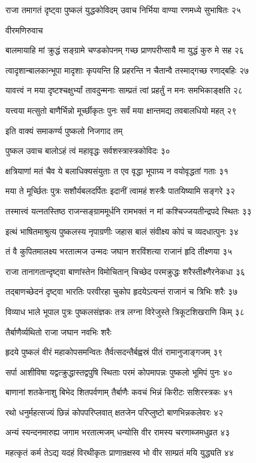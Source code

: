 राजा तमागतं दृष्ट्वा पुष्कलं युद्धकोविदम्
उवाच निर्भिया वाण्या रणमध्ये सुभाषितः २५

वीरमणिरुवाच

बालमायाहि मां क्रुद्धं सङ्ग्रामे चण्डकोपनम्
गच्छ प्राणपरीप्सायै मा युद्धं कुरु मे सह २६

त्वादृशान्बालकान्भूपा मादृशाः कृपयन्ति हि
प्रहरन्ति न चैतान्वै तस्माद्गच्छ रणाद्बहिः २७

यावत्त्वं न मया दृष्टश्चक्षुर्भ्यां तावदुन्मनाः
साम्प्रतं त्वां प्रहर्तुं न मनः समभिकाङ्क्षति २८

यत्त्वया मत्सुतो बाणैर्भिन्नो मूर्च्छीकृतः पुनः
सर्वं मया क्षान्तमद्य तवबालधियो महत् २९

इति वाक्यं समाकर्ण्य पुष्कलो निजगाद तम्

पुष्कल उवाच
बालोऽहं त्वं महावृद्धः सर्वशस्त्रास्त्रकोविदः ३०

क्षत्रियाणां मतं चैव ये बलाधिक्यसंयुताः
त एव वृद्धा भूपाग्र्य न वयोवृद्धतां गताः ३१

मया ते मूर्च्छितः पुत्रः सशौर्यबलदर्पितः
इदानीं त्वामहं शस्त्रैः पातयिष्यामि सङ्गरे ३२

तस्मात्त्वं यत्नतस्तिष्ठ राजन्सङ्ग्राममूर्धनि
रामभक्तं न मां कश्चिज्जयतीन्द्रपदे स्थितः ३३

इत्थं भाषितमाश्रुत्य पुष्कलस्य नृपाग्रणीः
जहास बालं संवीक्ष्य कोपं च व्यदधात्पुनः ३४

तं वै कुपितमालक्ष्य भरतात्मज उन्मदः
जघान शरविंशत्या राजानं हृदि तीक्ष्णया ३५

राजा तानागतान्दृष्ट्वा बाणांस्तेन विमोचितान्
चिच्छेद परमक्रुद्धः शरैस्तीक्ष्णैरनेकधा ३६

तद्बाणच्छेदनं दृष्ट्वा भारतिः परवीरहा
चुकोप हृदयेऽत्यन्तं राजानं च त्रिभिः शरैः ३७

विव्याध भाले भूपाल पुत्रः पुष्कलसंज्ञकः
तत्र लग्ना विरेजुस्ते त्रिकूटशिखराणि किम् ३८

तैर्बाणैर्व्यथितो राजा जघान नवभिः शरैः

हृदये पुष्कलं वीरं महाकोपसमन्वितः
तैर्वत्सदन्तैर्बह्वस्रं पीतं रामानुजाङ्गजम् ३९

सर्पा आशीविषा यद्वत्क्रुद्धास्तद्वपुषि स्थिताः
परमं कोपमापन्नः पुष्कलो भूमिपं पुनः ४०

बाणानां शतकेनाशु बिभेद शितपर्वणाम्
तैर्बाणैः कवचं भिन्नं किरीटः सशिरस्त्रकः ४१

रथो धनुर्महत्सज्यं छिन्नं कोपपरिप्लवात्
क्षतजेन परिप्लुष्टो बाणभिन्नकलेवरः ४२

अन्यं स्यन्दनमारुह्य जगाम भरतात्मजम्
धन्योसि वीर रामस्य चरणाब्जमधुव्रत ४३

महत्कृतं कर्म तेऽद्य यदहं विरथीकृतः
प्राणान्रक्षस्व भो वीर साम्प्रतं मयि युद्ध्यति ४४

